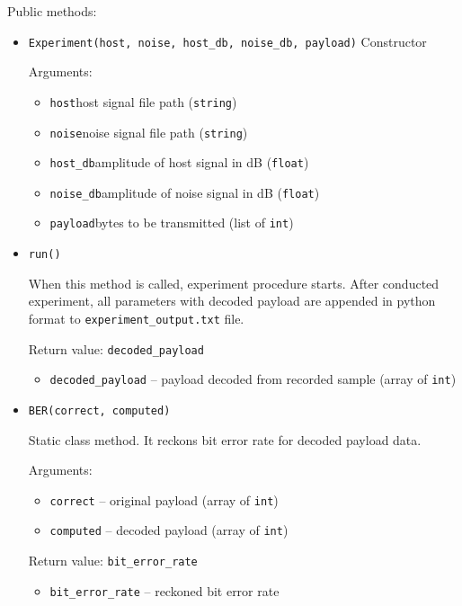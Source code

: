 Public methods:
\begin{itemize}
  \item \verb|Experiment(host, noise, host_db, noise_db, payload)|
    Constructor

    Arguments:
    \begin{itemize}
      \item \verb|host|\quad host signal file path (\verb|string|)
      \item \verb|noise|\quad noise signal file path (\verb|string|)
      \item \verb|host_db|\quad amplitude of host signal in \mbox{dB} (\verb|float|)
      \item \verb|noise_db|\quad amplitude of noise signal in \mbox{dB} (\verb|float|)
      \item \verb|payload|\quad bytes to be transmitted (list of \verb|int|)
    \end{itemize}

  \item \verb|run()|

    When this method is called, experiment procedure starts. After conducted experiment, all parameters with decoded payload are appended in python format to \verb|experiment_output.txt| file.

    Return value: \verb|decoded_payload|
    \begin{itemize}
    \item \verb|decoded_payload| – payload decoded from recorded sample (array of \verb|int|)
    \end{itemize}

  \item \verb|BER(correct, computed)|

    Static class method.
    It reckons bit error rate for decoded payload data.

    Arguments:
    \begin{itemize}
      \item \verb|correct| -- original payload (array of \verb|int|)
      \item \verb|computed| -- decoded payload (array of \verb|int|)
    \end{itemize}

    Return value: \verb|bit_error_rate|
    \begin{itemize}
      \item \verb|bit_error_rate| -- reckoned bit error rate
    \end{itemize}

\end{itemize}

